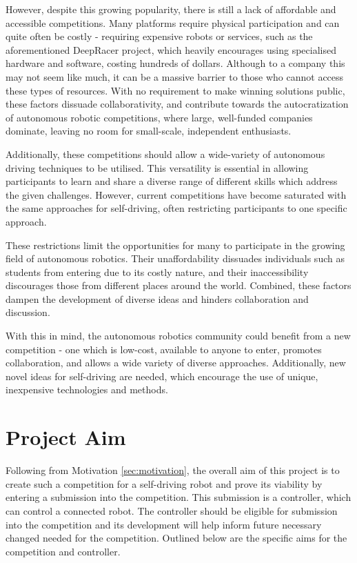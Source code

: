 \documentclass{l4proj}
\begin{document}
However, despite this growing popularity, there is still a lack of affordable and accessible competitions. Many platforms require physical participation and can quite often be costly - requiring expensive robots or services, such as the aforementioned DeepRacer project, which heavily encourages using specialised hardware and software, costing hundreds of dollars. Although to a company this may not seem like much, it can be a massive barrier to those who cannot access these types of resources. With no requirement to make winning solutions public, these factors dissuade collaborativity, and contribute towards the autocratization of autonomous robotic competitions, where large, well-funded companies dominate, leaving no room for small-scale, independent enthusiasts.

Additionally, these competitions should allow a wide-variety of autonomous driving techniques to be utilised. This versatility is essential in allowing participants to learn and share a diverse range of different skills which address the given challenges. However, current competitions have become saturated with the same approaches for self-driving, often restricting participants to one specific approach.

These restrictions limit the opportunities for many to participate in the growing field of autonomous robotics. Their unaffordability dissuades individuals such as students from entering due to its costly nature, and their inaccessibility discourages those from different places around the world. Combined, these factors dampen the development of diverse ideas and hinders collaboration and discussion.

With this in mind, the autonomous robotics community could benefit from a new competition - one which is low-cost, available to anyone to enter, promotes collaboration, and allows a wide variety of diverse approaches. Additionally, new novel ideas for self-driving are needed, which encourage the use of unique, inexpensive technologies and methods.


\section{Project Aim}
Following from Motivation \ref{sec:motivation}, the overall aim of this project is to create such a competition for a self-driving robot and prove its viability by entering a submission into the competition. This submission is a controller, which can control a connected robot. The controller should be eligible for submission into the competition and its development will help inform future necessary changed needed for the competition. Outlined below are the specific aims for the competition and controller. 
\end{document}
